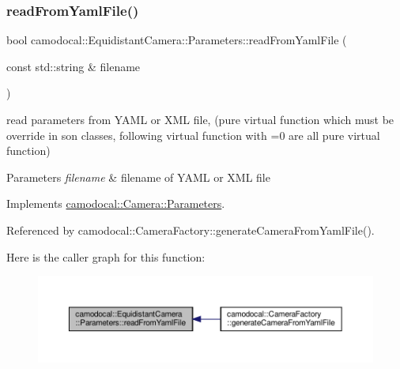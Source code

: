\subsubsection{\texorpdfstring{read\+From\+Yaml\+File()}{readFromYamlFile()}}
{\footnotesize\ttfamily bool camodocal\+::\+Equidistant\+Camera\+::\+Parameters\+::read\+From\+Yaml\+File (\begin{DoxyParamCaption}\item[{const std\+::string \&}]{filename }\end{DoxyParamCaption})\hspace{0.3cm}{\ttfamily [virtual]}}



read parameters from Y\+A\+ML or X\+ML file, (pure virtual function which must be override in son classes, following virtual function with \textquotesingle{}=0\textquotesingle{} are all pure virtual function) 


\begin{DoxyParams}{Parameters}
{\em filename} & filename of Y\+A\+ML or X\+ML file \\
\hline
\end{DoxyParams}


Implements \hyperlink{classcamodocal_1_1Camera_1_1Parameters_a7968503df2a99e022a0c52bf7dafe531}{camodocal\+::\+Camera\+::\+Parameters}.



Referenced by camodocal\+::\+Camera\+Factory\+::generate\+Camera\+From\+Yaml\+File().

Here is the caller graph for this function\+:\nopagebreak
\begin{figure}[H]
\begin{center}
\leavevmode
\includegraphics[width=350pt]{classcamodocal_1_1EquidistantCamera_1_1Parameters_a66d75d7cc90bd65120ca10914b38b935_icgraph}
\end{center}
\end{figure}
\mbox{\label{classcamodocal_1_1EquidistantCamera_1_1Parameters_afb2ad6884187c2b5e9f70f3e54e30321}} 
